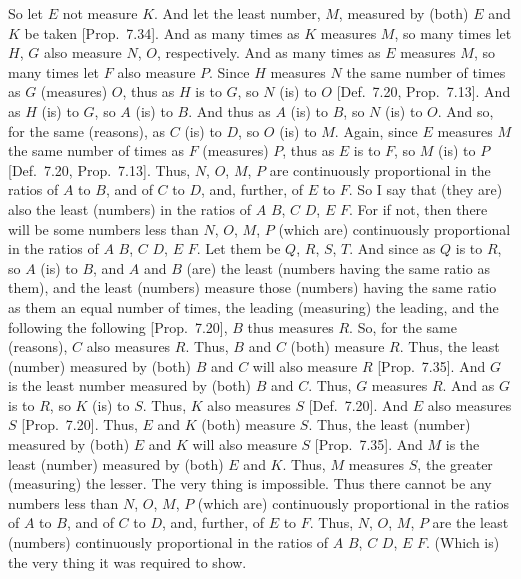 \begin{Parallel}{}{}
{So let $E$ not measure $K$. And let the least number, $M$, measured by 
(both) $E$ and $K$ be taken [Prop.~7.34]. And as
many times as $K$ measures $M$, so many times let  $H$, $G$
also measure  $N$, $O$, respectively.  And as many times as $E$ measures $M$,
so many times let $F$ also measure $P$. Since $H$ measures $N$ the same
number of times as $G$
(measures) $O$, thus as $H$ is to $G$, so
$N$ (is) to $O$ [Def.~7.20, Prop.~7.13]. And as $H$ (is) to $G$, so $A$ (is)
to $B$. And thus as $A$ (is) to $B$, so $N$ (is) to $O$. And so, for the
same (reasons),  as $C$ (is) to $D$, so $O$ (is) to $M$. Again, since
$E$ measures $M$ the same number of times as $F$ (measures) $P$,
thus as $E$ is to $F$, so $M$ (is) to $P$ [Def.~7.20, Prop.~7.13]. Thus, $N$, $O$, $M$, $P$ are continuously proportional in the ratios of $A$ to $B$, and of $C$ to $D$, and,
further, of $E$ to $F$. So I say that (they are) also the least (numbers)
in the ratios of $A$ $B$, $C$ $D$, $E$ $F$.
For if not, then there will be some numbers less than $N$, $O$, $M$, $P$
(which are) continuously proportional in the ratios of $A$ $B$, $C$ $D$,
$E$ $F$. Let them be $Q$, $R$, $S$, $T$.
And since as $Q$ is to $R$, so $A$ (is) to $B$, and $A$ and $B$ (are) the
least (numbers having the same ratio as them), and the least (numbers) measure those
(numbers) having the same ratio as them an equal number of times, the leading (measuring) the leading, and the following the following [Prop.~7.20], $B$ thus measures $R$. So, for the
same (reasons), $C$ also measures $R$.  Thus, $B$ and $C$ (both)
measure $R$. Thus, the least (number) measured by (both) $B$ and $C$ will
also measure $R$ [Prop.~7.35]. And $G$ is the
least number measured by (both) $B$ and $C$. Thus, $G$ measures $R$.
And as $G$ is to $R$, so $K$ (is) to $S$. Thus, $K$ also measures $S$
[Def.~7.20]. And $E$ also measures $S$ [Prop.~7.20]. Thus, $E$ and $K$ (both) measure
$S$. Thus, the least (number) measured by (both) $E$ and $K$ will also
measure $S$   [Prop.~7.35]. And $M$  is the least (number) measured by (both)
$E$ and $K$. Thus, $M$ measures $S$, the greater (measuring) the lesser. The very thing is impossible.
Thus there cannot be any numbers less than $N$, $O$, $M$, $P$ (which
are) continuously proportional in the ratios of $A$ to $B$, and of
$C$ to $D$, and, further, of $E$ to $F$. Thus, $N$, $O$, $M$, $P$
are the least (numbers) continuously proportional in the ratios
of $A$ $B$, $C$ $D$, $E$ $F$. (Which is) the very thing it
was required to show.}
\end{Parallel}

